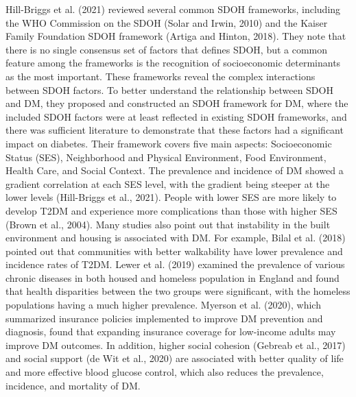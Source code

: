 Hill-Briggs et al. (2021) reviewed several common SDOH frameworks, including the WHO Commission on the SDOH (Solar and Irwin, 2010) and the Kaiser Family Foundation SDOH framework (Artiga and Hinton, 2018). They note that there is no single consensus set of factors that defines SDOH, but a common feature among the frameworks is the recognition of socioeconomic determinants as the most important. These frameworks reveal the complex interactions between SDOH factors. To better understand the relationship between SDOH and DM, they proposed and constructed an SDOH framework for DM, where the included SDOH factors were at least reflected in existing SDOH frameworks, and there was sufficient literature to demonstrate that these factors had a significant impact on diabetes. Their framework covers five main aspects: Socioeconomic Status (SES), Neighborhood and Physical Environment, Food Environment, Health Care, and Social Context. The prevalence and incidence of DM showed a gradient correlation at each SES level, with the gradient being steeper at the lower levels (Hill-Briggs et al., 2021). People with lower SES are more likely to develop T2DM and experience more complications than those with higher SES (Brown et al., 2004). Many studies also point out that instability in the built environment and housing is associated with DM. For example, Bilal et al. (2018) pointed out that communities with better walkability have lower prevalence and incidence rates of T2DM. Lewer et al. (2019) examined the prevalence of various chronic diseases in both housed and homeless population in England and found that health disparities between the two groups were significant, with the homeless populations having a much higher prevalence. Myerson et al. (2020), which summarized insurance policies implemented to improve DM prevention and diagnosis, found that expanding insurance coverage for low-income adults may improve DM outcomes. In addition, higher social cohesion (Gebreab et al., 2017) and social support (de Wit et al., 2020) are associated with better quality of life and more effective blood glucose control, which also reduces the prevalence, incidence, and mortality of DM.


